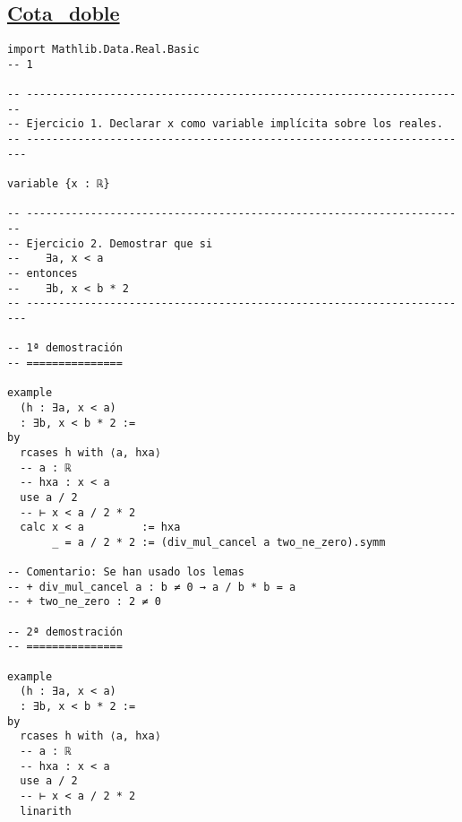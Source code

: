 \subsection{\href{./src/Logica/Cota\_doble.lean}{Cota\_doble}}
\label{sec:org9bd94f5}
\begin{verbatim}
import Mathlib.Data.Real.Basic                                               -- 1

-- ---------------------------------------------------------------------
-- Ejercicio 1. Declarar x como variable implícita sobre los reales.
-- ----------------------------------------------------------------------

variable {x : ℝ}

-- ---------------------------------------------------------------------
-- Ejercicio 2. Demostrar que si
--    ∃a, x < a
-- entonces
--    ∃b, x < b * 2
-- ----------------------------------------------------------------------

-- 1ª demostración
-- ===============

example
  (h : ∃a, x < a)
  : ∃b, x < b * 2 :=
by
  rcases h with ⟨a, hxa⟩
  -- a : ℝ
  -- hxa : x < a
  use a / 2
  -- ⊢ x < a / 2 * 2
  calc x < a         := hxa
       _ = a / 2 * 2 := (div_mul_cancel a two_ne_zero).symm

-- Comentario: Se han usado los lemas
-- + div_mul_cancel a : b ≠ 0 → a / b * b = a
-- + two_ne_zero : 2 ≠ 0

-- 2ª demostración
-- ===============

example
  (h : ∃a, x < a)
  : ∃b, x < b * 2 :=
by
  rcases h with ⟨a, hxa⟩
  -- a : ℝ
  -- hxa : x < a
  use a / 2
  -- ⊢ x < a / 2 * 2
  linarith
\end{verbatim}

